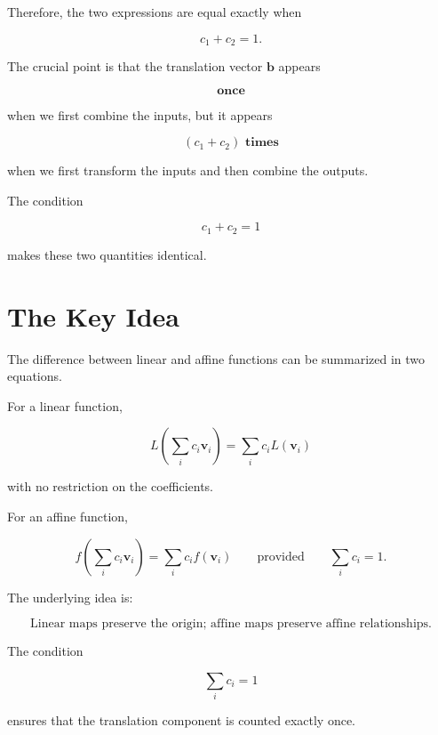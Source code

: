 \documentclass[12pt]{article}
\newcommand{\Vector}[1]{\mathbf{#1}}
\begin{document}
Therefore, the two expressions are equal exactly when

\[
    c_1+c_2=1.
\]

The crucial point is that the translation vector $\Vector{b}$ appears

\[
\textbf{once}
\]

when we first combine the inputs, but it appears

\[
(c_1+c_2)\textbf{ times}
\]

when we first transform the inputs and then combine the outputs.

The condition

\[
    c_1+c_2=1
\]

makes these two quantities identical.


\section{The Key Idea}

The difference between linear and affine functions can be summarized
in two equations.

For a linear function,

\[
\boxed{
L\left(
    \sum_i c_i\Vector{v}_i
\right)
=
\sum_i c_iL(\Vector{v}_i)
}
\]

with no restriction on the coefficients.

For an affine function,

\[
\boxed{
f\left(
    \sum_i c_i\Vector{v}_i
\right)
=
\sum_i c_if(\Vector{v}_i)
\qquad
\text{provided}
\qquad
\sum_i c_i=1.
}
\]

The underlying idea is:

\[
\boxed{
\text{Linear maps preserve the origin;
affine maps preserve affine relationships.}
}
\]

The condition

\[
    \boxed{\sum_i c_i=1}
\]

ensures that the translation component is counted exactly once.
\end{document}

